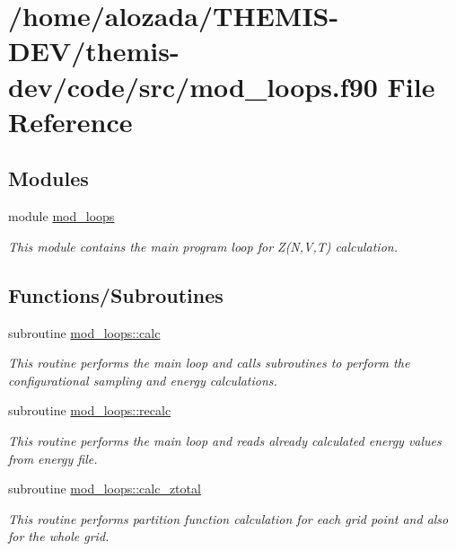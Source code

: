 \hypertarget{mod__loops_8f90}{}\section{/home/alozada/\+T\+H\+E\+M\+I\+S-\/\+D\+E\+V/themis-\/dev/code/src/mod\+\_\+loops.f90 File Reference}
\label{mod__loops_8f90}
\subsection*{Modules}
\begin{DoxyCompactItemize}
\item 
module \hyperlink{namespacemod__loops}{mod\+\_\+loops}
\begin{DoxyCompactList}\small\item\em This module contains the main program loop for Z(\+N,\+V,\+T) calculation. \end{DoxyCompactList}\end{DoxyCompactItemize}
\subsection*{Functions/\+Subroutines}
\begin{DoxyCompactItemize}
\item 
subroutine \hyperlink{namespacemod__loops_a6e4de9cf9c585c364502a63d328071bd}{mod\+\_\+loops\+::calc}
\begin{DoxyCompactList}\small\item\em This routine performs the main loop and calls subroutines to perform the configurational sampling and energy calculations. \end{DoxyCompactList}\item 
subroutine \hyperlink{namespacemod__loops_a755c1c6e9232a99181d4ac9a7c0c5cff}{mod\+\_\+loops\+::recalc}
\begin{DoxyCompactList}\small\item\em This routine performs the main loop and reads already calculated energy values from energy file. \end{DoxyCompactList}\item 
subroutine \hyperlink{namespacemod__loops_acfec0f16ef59b6277e9dfd13d5026965}{mod\+\_\+loops\+::calc\+\_\+ztotal}
\begin{DoxyCompactList}\small\item\em This routine performs partition function calculation for each grid point and also for the whole grid. \end{DoxyCompactList}\end{DoxyCompactItemize}
